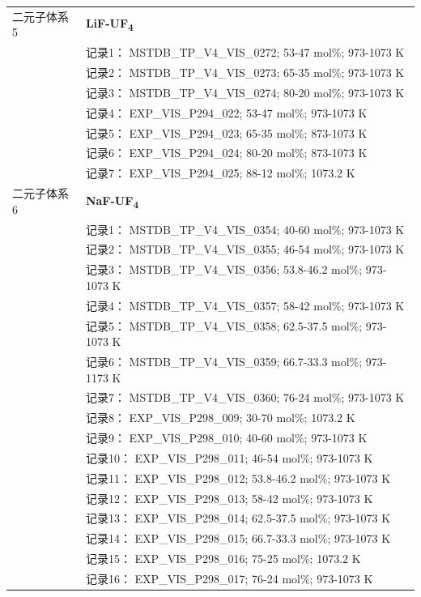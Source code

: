 \documentclass[12pt]{article}
\begin{document}
{\begin{longtable}[]{@{}
  >{\raggedright\arraybackslash}p{}
  >{\raggedright\arraybackslash}p{}@{}}
二元子体系 5  & \textbf{LiF-UF\textsubscript{4}} \\
 & 记录1： MSTDB\_TP\_V4\_VIS\_0272; 53-47 mol\%; 973-1073 K \\
 & 记录2： MSTDB\_TP\_V4\_VIS\_0273; 65-35 mol\%; 973-1073 K \\
 & 记录3： MSTDB\_TP\_V4\_VIS\_0274; 80-20 mol\%; 973-1073 K \\
 & 记录4： EXP\_VIS\_P294\_022; 53-47 mol\%; 973-1073 K \\
 & 记录5： EXP\_VIS\_P294\_023; 65-35 mol\%; 873-1073 K \\
 & 记录6： EXP\_VIS\_P294\_024; 80-20 mol\%; 873-1073 K \\
 & 记录7： EXP\_VIS\_P294\_025; 88-12 mol\%; 1073.2 K  \\

二元子体系 6  & \textbf{NaF-UF\textsubscript{4}} \\
 & 记录1： MSTDB\_TP\_V4\_VIS\_0354; 40-60 mol\%; 973-1073 K \\
 & 记录2： MSTDB\_TP\_V4\_VIS\_0355; 46-54 mol\%; 973-1073 K \\
 & 记录3： MSTDB\_TP\_V4\_VIS\_0356; 53.8-46.2 mol\%; 973-1073 K \\
 & 记录4： MSTDB\_TP\_V4\_VIS\_0357; 58-42 mol\%; 973-1073 K \\
 & 记录5： MSTDB\_TP\_V4\_VIS\_0358; 62.5-37.5 mol\%; 973-1073 K \\
 & 记录6： MSTDB\_TP\_V4\_VIS\_0359; 66.7-33.3 mol\%; 973-1173 K \\
 & 记录7： MSTDB\_TP\_V4\_VIS\_0360; 76-24 mol\%; 973-1073 K \\
 & 记录8： EXP\_VIS\_P298\_009; 30-70 mol\%; 1073.2 K \\
 & 记录9： EXP\_VIS\_P298\_010; 40-60 mol\%; 973-1073 K \\
 & 记录10： EXP\_VIS\_P298\_011; 46-54 mol\%; 973-1073 K \\
 & 记录11： EXP\_VIS\_P298\_012; 53.8-46.2 mol\%; 973-1073 K \\
 & 记录12： EXP\_VIS\_P298\_013; 58-42 mol\%; 973-1073 K \\
 & 记录13： EXP\_VIS\_P298\_014; 62.5-37.5 mol\%; 973-1073 K \\
 & 记录14： EXP\_VIS\_P298\_015; 66.7-33.3 mol\%; 973-1073 K \\
 & 记录15： EXP\_VIS\_P298\_016; 75-25 mol\%; 1073.2 K \\
 & 记录16： EXP\_VIS\_P298\_017; 76-24 mol\%; 973-1073 K  \\


\end{longtable}}
\end{document}
